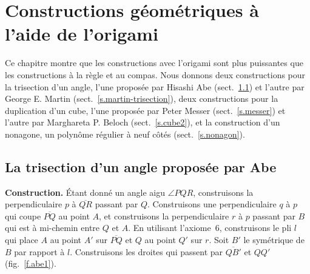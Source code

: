 
\chapter{Constructions géométriques à l'aide de l'origami}\label{c.origami-constructions}




Ce chapitre montre que les constructions avec l'origami sont plus puissantes que les constructions à la  règle et au compas. Nous donnons deux constructions pour la trisection d'un angle, l'une proposée par Hisashi Abe (sect.~\ref{s.abe-trisection}) et l'autre par George E. Martin (sect.~\ref{s.martin-trisection}), deux constructions pour la duplication d'un cube, l'une proposée par Peter Messer (sect.~\ref{s.messer}) et l'autre par Marghareta P. Beloch (sect.~\ref{s.cube2}), et la construction d'un nonagone, un polynôme régulier à neuf côtés (sect.~\ref{s.nonagon}).

\section{La trisection d'un angle proposée par Abe}\label{s.abe-trisection}


\noindent\textbf{Construction.}
Étant donné un angle aigu $\angle PQR$, construisons  la perpendiculaire  $p$ à $\overline{QR}$ passant par $Q$. Construisons  une perpendiculaire $q$ à $p$ qui coupe $\overline{PQ}$ au point $A$, et construisons  la perpendiculaire $r$ à $p$ passant par $B$ qui est à mi-chemin entre $Q$ et $A$. En utilisant l'axiome~6, construisons  le pli $l$ qui place $A$ au point $A'$ sur $\overline{PQ}$ et $Q$ au point $Q'$ sur $r$. Soit $B'$ le symétrique de $B$ par rapport à $l$. Construisons les droites qui passent par $\overline{QB'}$ et $QQ'$ (fig.~\ref{f.abe1}).

